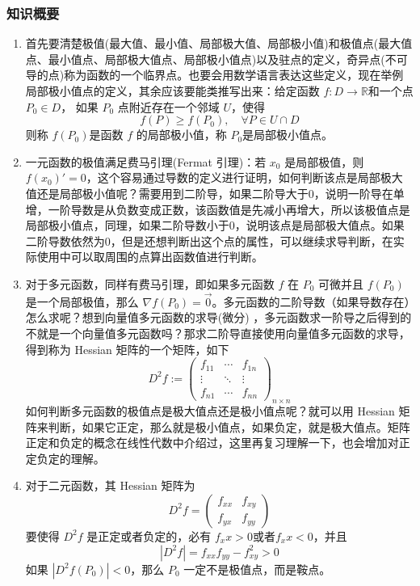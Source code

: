 \subsubsection{知识概要}
\begin{enumerate}
    \item 首先要清楚极值(最大值、最小值、局部极大值、局部极小值)和极值点(最大值点、最小值点、局部极大值点、局部极小值点)以及驻点的定义，奇异点(不可导的点)称为函数的一个临界点。也要会用数学语言表达这些定义，现在举例局部极小值点的定义，其余应该要能类推写出来：给定函数 $f : D \to \mathbb{R}$和一个点 $P_0 \in D$， 如果 $P_0$ 点附近存在一个邻域 $U$，使得
    $$
    f(P) \geq f(P_0), \quad \forall P \in U \cap D
    $$
    则称 $f(P_0)$是函数 $f$ 的局部极小值，称 $P_0$是局部极小值点。

    \item 一元函数的极值满足费马引理(Fermat 引理)：若 $ x_0 $ 是局部极值，则 $f(x_0) ' =0$，这个容易通过导数的定义进行证明，如何判断该点是局部极大值还是局部极小值呢？需要用到二阶导，如果二阶导大于0，说明一阶导在单增，一阶导数是从负数变成正数，该函数值是先减小再增大，所以该极值点是局部极小值点，同理，如果二阶导数小于0，说明该点是局部极大值点。如果二阶导数依然为0，但是还想判断出这个点的属性，可以继续求导判断，在实际使用中可以取周围的点算出函数值进行判断。
    
    \item 对于多元函数，同样有费马引理，即如果多元函数 $f$ 在 $P_0$ 可微并且 $f(P_0)$ 是一个局部极值，那么 $\nabla f(P_0) = \vec{0}$。多元函数的二阶导数（如果导数存在）怎么求呢？想到向量值多元函数的求导(微分) ，多元函数求一阶导之后得到的不就是一个向量值多元函数吗？那求二阶导直接使用向量值多元函数的求导，得到称为  Hessian 矩阵的一个矩阵，如下
    $$
    D^{2}f:=\left(
    \begin{array}{ccc}
    f_{11} & \cdots & f_{1n} \\
    \vdots & \ddots & \vdots \\
    f_{n1} & \cdots&f_{nn}
    \end{array}
    \right)_{n\times n}
    $$
    如何判断多元函数的极值点是极大值点还是极小值点呢？就可以用 Hessian 矩阵来判断，如果它正定，那么就是极小值点，如果负定，就是极大值点。矩阵正定和负定的概念在线性代数中介绍过，这里再复习理解一下，也会增加对正定负定的理解。

    \item 对于二元函数，其 Hessian 矩阵为
    $$
    D^2f=\left(\begin{array}{cc}f_{xx}&f_{xy}\\f_{yx}&f_{yy}\end{array}\right)
    $$
    要使得 $D^2f$ 是正定或者负定的，必有 $f_xx > 0 或者 f_xx < 0 $，并且
    $$
    |D^2f|=f_{xx}f_{yy}-f_{xy}^2>0
    $$
    如果 $ |D^2f(P_0)| < 0  $，那么 $P_0$ 一定不是极值点，而是鞍点。


\end{enumerate}
